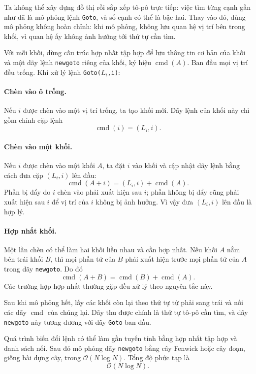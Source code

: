 \documentclass[11pt]{article}
\newcommand{\Oh}{\mathcal{O}}
\begin{document}
Ta không thể xây dựng đồ thị rồi sắp xếp tô-pô trực tiếp: việc tìm từng cạnh
gần như đã là mô phỏng lệnh \texttt{Goto}, và số cạnh có thể là bậc hai. Thay
vào đó, dùng mô phỏng không hoàn chỉnh: khi mô phỏng, không lưu quan hệ vị trí
bên trong khối, vì quan hệ ấy không ảnh hưởng tới thứ tự cần tìm.

Với mỗi khối, dùng cấu trúc hợp nhất tập hợp để lưu thông tin cơ bản của khối
và một dãy lệnh \texttt{newgoto} riêng của khối, ký hiệu $\operatorname{cmd}(A)$.
Ban đầu mọi vị trí đều trống. Khi xử lý lệnh \texttt{Goto(\(L_i\),i)}:

\paragraph{Chèn vào ô trống.}
Nếu $i$ được chèn vào một vị trí trống, ta tạo khối mới. Dãy lệnh của khối này
chỉ gồm chính cặp lệnh
\[
  \operatorname{cmd}(i)=(L_i,i).
\]

\paragraph{Chèn vào một khối.}
Nếu $i$ được chèn vào một khối $A$, ta đặt $i$ vào khối và cập nhật dãy lệnh
bằng cách đưa cặp $(L_i,i)$ lên đầu:
\[
  \operatorname{cmd}(A+i)=(L_i,i)+\operatorname{cmd}(A).
\]
Phần bị đẩy do $i$ chèn vào phải xuất hiện sau $i$; phần không bị đẩy cũng
phải xuất hiện sau $i$ để vị trí của $i$ không bị ảnh hưởng. Vì vậy đưa
$(L_i,i)$ lên đầu là hợp lý.

\paragraph{Hợp nhất khối.}
Một lần chèn có thể làm hai khối liền nhau và cần hợp nhất. Nếu khối $A$ nằm
bên trái khối $B$, thì mọi phần tử của $B$ phải xuất hiện trước mọi phần tử
của $A$ trong dãy \texttt{newgoto}. Do đó
\[
  \operatorname{cmd}(A+B)=\operatorname{cmd}(B)+\operatorname{cmd}(A).
\]
Các trường hợp hợp nhất thường gặp đều xử lý theo nguyên tắc này.

Sau khi mô phỏng hết, lấy các khối còn lại theo thứ tự từ phải sang trái và
nối các dãy $\operatorname{cmd}$ của chúng lại. Dãy thu được chính là thứ tự
tô-pô cần tìm, và dãy \texttt{newgoto} này tương đương với dãy \texttt{Goto}
ban đầu.

Quá trình biến đổi lệnh có thể làm gần tuyến tính bằng hợp nhất tập hợp và
danh sách nối. Sau đó mô phỏng dãy \texttt{newgoto} bằng cây Fenwick hoặc cây
đoạn, giống bài dựng cây, trong $\Oh(N\log N)$. Tổng độ phức tạp là
\[
  \Oh(N\log N).
\]
\end{document}

